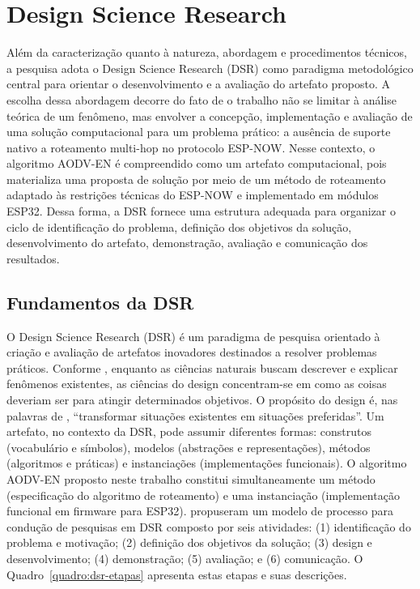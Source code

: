\section{Design Science Research}\label{design-science-research}

Além da caracterização quanto à natureza, abordagem e procedimentos
técnicos, a pesquisa adota o Design Science Research (DSR) como
paradigma metodológico central para orientar o desenvolvimento e a
avaliação do artefato proposto. A escolha dessa abordagem decorre do
fato de o trabalho não se limitar à análise teórica de um fenômeno, mas
envolver a concepção, implementação e avaliação de uma solução
computacional para um problema prático: a ausência de suporte nativo a
roteamento multi-hop no protocolo ESP-NOW. Nesse contexto, o algoritmo
AODV-EN é compreendido como um artefato computacional, pois materializa
uma proposta de solução por meio de um método de roteamento adaptado às
restrições técnicas do ESP-NOW e implementado em módulos ESP32. Dessa
forma, a DSR fornece uma estrutura adequada para organizar o ciclo de
identificação do problema, definição dos objetivos da solução,
desenvolvimento do artefato, demonstração, avaliação e comunicação dos
resultados.

\subsection{Fundamentos da DSR}\label{fundamentos-da-dsr}

O Design Science Research (DSR) é um paradigma de pesquisa orientado à
criação e avaliação de artefatos inovadores destinados a resolver
problemas práticos. Conforme , enquanto as
ciências naturais buscam descrever e explicar fenômenos existentes, as
ciências do design concentram-se em como as coisas deveriam ser para
atingir determinados objetivos. O propósito do design é, nas palavras de
, ``transformar situações existentes em situações
preferidas''. Um artefato, no contexto da DSR, pode assumir diferentes
formas: construtos (vocabulário e símbolos), modelos (abstrações e
representações), métodos (algoritmos e práticas) e instanciações
(implementações funcionais). O algoritmo AODV-EN proposto neste trabalho
constitui simultaneamente um método (especificação do algoritmo de
roteamento) e uma instanciação (implementação funcional em firmware para
ESP32).  propuseram um modelo de processo para
condução de pesquisas em DSR composto por seis atividades: (1)
identificação do problema e motivação; (2) definição dos objetivos da
solução; (3) design e desenvolvimento; (4) demonstração; (5) avaliação;
e (6) comunicação. O Quadro~\ref{quadro:dsr-etapas} apresenta estas etapas e suas descrições.

